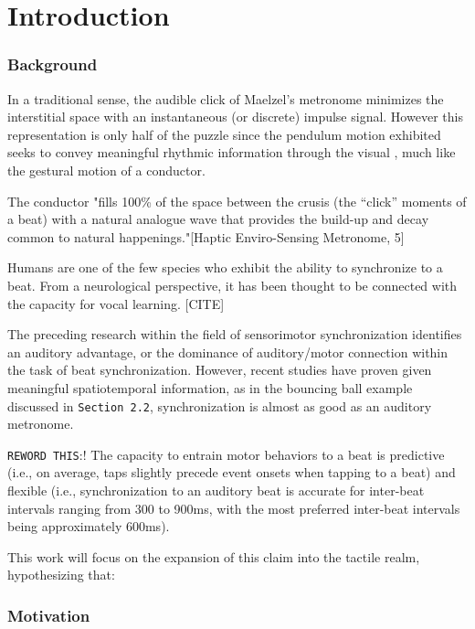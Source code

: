 
\chapter{Introduction} \label{secIntro}

\subsection{Background}
In a traditional sense, the audible click of Maelzel's metronome minimizes the interstitial space with an instantaneous (or discrete) impulse signal. However this representation is only half of the puzzle since the pendulum motion exhibited seeks to convey meaningful rhythmic information through the visual , much like the gestural motion of a conductor.

The conductor "fills 100\% of the space between the crusis (the “click” moments of a beat) with a natural analogue wave that provides the build-up and decay common to natural happenings."[Haptic Enviro-Sensing Metronome, 5]

Humans are one of the few species who exhibit the ability to synchronize to a beat. From a neurological perspective, it has been thought to be connected with the capacity for vocal learning. [CITE]

The preceding research within the field of sensorimotor synchronization identifies an auditory advantage, or the dominance of auditory/motor connection within the task of beat synchronization. However, recent studies have proven given meaningful spatiotemporal information, as in the bouncing ball example discussed in \verb!Section 2.2!, synchronization is almost as good as an auditory metronome.

\verb!REWORD THIS!:!
The capacity to entrain motor behaviors to a beat is predictive (i.e., on average, taps slightly precede event onsets when tapping to a beat) and flexible (i.e., synchronization to an auditory beat is accurate for inter-beat intervals ranging from 300 to 900ms, with the most preferred inter-beat intervals being approximately 600ms).~\cite{repp2013sensorimotor}

This work will focus on the expansion of this claim into the tactile realm, hypothesizing that:

\subsection{Motivation}

